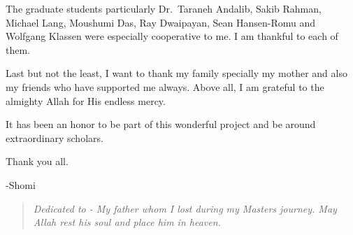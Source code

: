 \begin{acknowledgments}
The graduate students particularly Dr.~Taraneh Andalib, Sakib Rahman, Michael Lang, Moushumi Das, Ray Dwaipayan, Sean Hansen-Romu and Wolfgang Klassen were especially cooperative to me. I am thankful to each of them. 

Last but not the least, I want to thank my family specially my mother and also my friends who have supported me always. Above all, I am grateful to the almighty Allah for His endless mercy.

It has been an honor to be part of this wonderful project and be around extraordinary scholars.

\vspace{2em}
Thank you all.

-Shomi

\end{acknowledgments}

%



\dedication
\vspace*{\fill}
\begin{center}
\begin{quote}
\hfil \hsp \Large \em Dedicated to - My father whom I lost during my Masters journey. May Allah rest his soul and place him in heaven.\hfil
\end{quote}
\vspace*{\fill}
\end{center}
\newpage
\cleardoublepage
\thispagestyle{empty}
\startarabicpagination
